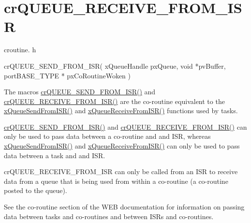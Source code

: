 \hypertarget{group__crQUEUE__RECEIVE__FROM__ISR}{}\section{cr\+Q\+U\+E\+U\+E\+\_\+\+R\+E\+C\+E\+I\+V\+E\+\_\+\+F\+R\+O\+M\+\_\+\+I\+SR}
\label{group__crQUEUE__RECEIVE__FROM__ISR}
croutine. h 
\begin{DoxyPre}
 crQUEUE\_SEND\_FROM\_ISR(
                           xQueueHandle pxQueue,
                           void *pvBuffer,
                           portBASE\_TYPE * pxCoRoutineWoken
                      )\end{DoxyPre}


The macro\textquotesingle{}s \hyperlink{croutine_8h_ac8eb0a81c5cf69de7e4edd73ce44a3be}{cr\+Q\+U\+E\+U\+E\+\_\+\+S\+E\+N\+D\+\_\+\+F\+R\+O\+M\+\_\+\+I\+S\+R()} and \hyperlink{croutine_8h_a9c0fa977ca69adbddb4811affa2a71f7}{cr\+Q\+U\+E\+U\+E\+\_\+\+R\+E\+C\+E\+I\+V\+E\+\_\+\+F\+R\+O\+M\+\_\+\+I\+S\+R()} are the co-\/routine equivalent to the \hyperlink{queue_8h_a21d5919ed26c21d121df4a4debeb643c}{x\+Queue\+Send\+From\+I\+S\+R()} and \hyperlink{queue_8h_a674c9671220a01ef6b88a9429b1eaf94}{x\+Queue\+Receive\+From\+I\+S\+R()} functions used by tasks.

\hyperlink{croutine_8h_ac8eb0a81c5cf69de7e4edd73ce44a3be}{cr\+Q\+U\+E\+U\+E\+\_\+\+S\+E\+N\+D\+\_\+\+F\+R\+O\+M\+\_\+\+I\+S\+R()} and \hyperlink{croutine_8h_a9c0fa977ca69adbddb4811affa2a71f7}{cr\+Q\+U\+E\+U\+E\+\_\+\+R\+E\+C\+E\+I\+V\+E\+\_\+\+F\+R\+O\+M\+\_\+\+I\+S\+R()} can only be used to pass data between a co-\/routine and and I\+SR, whereas \hyperlink{queue_8h_a21d5919ed26c21d121df4a4debeb643c}{x\+Queue\+Send\+From\+I\+S\+R()} and \hyperlink{queue_8h_a674c9671220a01ef6b88a9429b1eaf94}{x\+Queue\+Receive\+From\+I\+S\+R()} can only be used to pass data between a task and and I\+SR.

cr\+Q\+U\+E\+U\+E\+\_\+\+R\+E\+C\+E\+I\+V\+E\+\_\+\+F\+R\+O\+M\+\_\+\+I\+SR can only be called from an I\+SR to receive data from a queue that is being used from within a co-\/routine (a co-\/routine posted to the queue).

See the co-\/routine section of the W\+EB documentation for information on passing data between tasks and co-\/routines and between I\+SR\textquotesingle{}s and co-\/routines.


